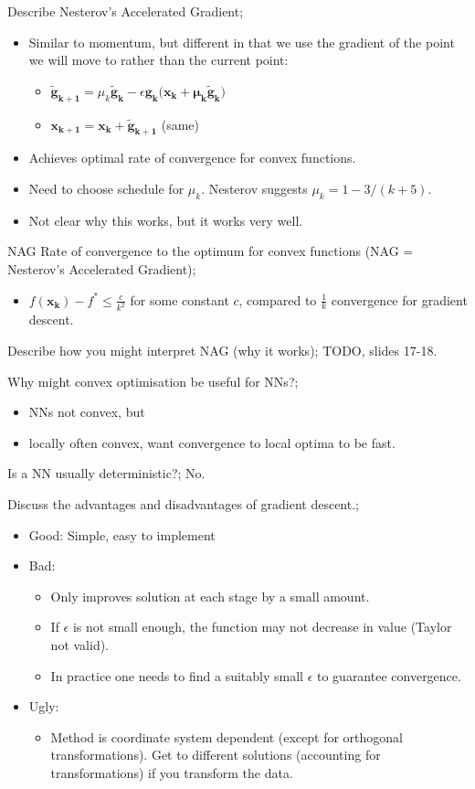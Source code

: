 \documentclass{article}
\begin{document}
Describe Nesterov's Accelerated Gradient; \begin{itemize} \item Similar to momentum, but different in that we use the gradient of the point we will move to rather than the current point: \begin{itemize} \item $\mathbf{\tilde{g}_{k+1}}=\mu_k\mathbf{\tilde{g}_k}-\epsilon \mathbf{g_k(x_k+\mu_k\tilde{g}_k})$ \item $\mathbf{x_{k+1}=x_k+\tilde{g}_{k+1}}$ (same) \end{itemize} \item Achieves optimal rate of convergence for convex functions.  \item Need to choose schedule for $\mu_k$. Nesterov suggests $\mu_k = 1 - 3/(k+5)$.  \item Not clear why this works, but it works very well.  \end{itemize}

NAG Rate of convergence to the optimum for convex functions (NAG = Nesterov's Accelerated Gradient); \begin{itemize} \item $f(\mathbf{x_k})-f^*\leq \frac{c}{k^2}$ for some constant $c$, compared to $\frac{1}{k}$ convergence for gradient descent.  \end{itemize}

Describe how you might interpret NAG (why it works); TODO, slides 17-18.

Why might convex optimisation be useful for NNs?; \begin{itemize} \item NNs not convex, but \item locally often convex, want convergence to local optima to be fast.  \end{itemize}

Is a NN usually deterministic?; No.

Discuss the advantages and disadvantages of gradient descent.; \begin{itemize} \item Good: Simple, easy to implement \item Bad: \begin{itemize} \item Only improves solution at each stage by a small amount.  \item If $\epsilon$ is not small enough, the function may not decrease in value (Taylor not valid). \item In practice one needs to find a suitably small $\epsilon$ to guarantee convergence.  \end{itemize} \item Ugly: \begin{itemize} \item Method is coordinate system dependent (except for orthogonal transformations). Get to different solutions (accounting for transformations) if you transform the data.  \end{itemize} \end{itemize}
\end{document}
